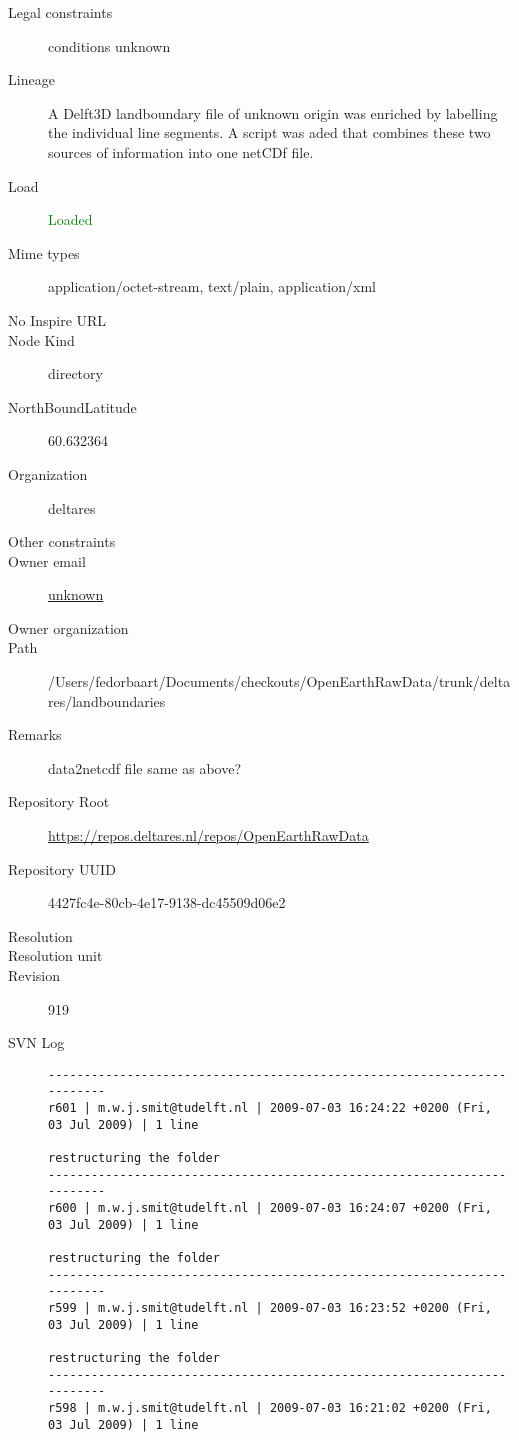 \documentclass[9]{report}
\begin{document}
\begin{description}
  \item[Legal constraints] conditions unknown
  \item[Lineage] A Delft3D landboundary file of unknown origin was enriched by labelling the individual line segments. A script was aded that combines these two sources of information into one netCDf file.
  \item[Load] \textcolor{green}{Loaded}
  \item[Mime types] application/octet-stream, text/plain, application/xml
  \item[No Inspire URL] 
  \item[Node Kind] directory
  \item[NorthBoundLatitude] 60.632364
  \item[Organization] deltares
  \item[Other constraints] 
  \item[Owner email] \href{mailto:unknown}{unknown}
  \item[Owner organization] 
  \item[Path] /Users/fedorbaart/Documents/checkouts/OpenEarthRawData/trunk/deltares/landboundaries
  \item[Remarks] data2netcdf file same as above?
  \item[Repository Root] \href{https://repos.deltares.nl/repos/OpenEarthRawData}{https://repos.deltares.nl/repos/OpenEarthRawData}
  \item[Repository UUID] 4427fc4e-80cb-4e17-9138-dc45509d06e2
  \item[Resolution] 
  \item[Resolution unit] 
  \item[Revision] 919
  \item[SVN Log] \begin{verbatim}
------------------------------------------------------------------------
r601 | m.w.j.smit@tudelft.nl | 2009-07-03 16:24:22 +0200 (Fri, 03 Jul 2009) | 1 line

restructuring the folder
------------------------------------------------------------------------
r600 | m.w.j.smit@tudelft.nl | 2009-07-03 16:24:07 +0200 (Fri, 03 Jul 2009) | 1 line

restructuring the folder
------------------------------------------------------------------------
r599 | m.w.j.smit@tudelft.nl | 2009-07-03 16:23:52 +0200 (Fri, 03 Jul 2009) | 1 line

restructuring the folder
------------------------------------------------------------------------
r598 | m.w.j.smit@tudelft.nl | 2009-07-03 16:21:02 +0200 (Fri, 03 Jul 2009) | 1 line


\end{verbatim}
\end{description}
\end{document}
